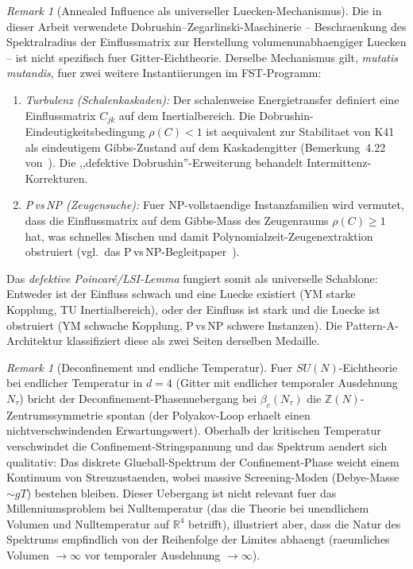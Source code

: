\documentclass[12pt,a4paper]{article}
\theoremstyle{definition}
\theoremstyle{plain}
\theoremstyle{remark}
\newtheorem{remark}[definition]{Remark}
\begin{document}
\begin{remark}[Annealed Influence als universeller Luecken-Mechanismus]
\label{rem:annealed-influence-universal}
Die in dieser Arbeit verwendete Dobrushin--Zegarlinski-Maschinerie -- Beschraenkung des Spektralradius der Einflussmatrix zur Herstellung volumenunabhaengiger Luecken -- ist nicht spezifisch fuer Gitter-Eichtheorie. Derselbe Mechanismus gilt, \emph{mutatis mutandis}, fuer zwei weitere Instantiierungen im FST-Programm:
\begin{enumerate}
\item \emph{Turbulenz (Schalenkaskaden):} Der schalenweise Energietransfer definiert eine Einflussmatrix $C_{jk}$ auf dem Inertialbereich. Die Dobrushin-Eindeutigkeitsbedingung $\rho(C) < 1$ ist aequivalent zur Stabilitaet von K41 als eindeutigem Gibbs-Zustand auf dem Kaskadengitter (Bemerkung~4.22 von~\cite{Geiger2026-TU}). Die ,,defektive Dobrushin''-Erweiterung behandelt Intermittenz-Korrekturen.
\item \emph{P\,vs\,NP (Zeugensuche):} Fuer NP-vollstaendige Instanzfamilien wird vermutet, dass die Einflussmatrix auf dem Gibbs-Mass des Zeugenraums $\rho(C) \geq 1$ hat, was schnelles Mischen und damit Polynomialzeit-Zeugenextraktion obstruiert (vgl.\ das P\,vs\,NP-Begleitpaper~\cite{Geiger2026-PvsNP}).
\end{enumerate}
Das \emph{defektive Poincar\'{e}/LSI-Lemma} fungiert somit als universelle Schablone: Entweder ist der Einfluss schwach und eine Luecke existiert (YM starke Kopplung, TU Inertialbereich), oder der Einfluss ist stark und die Luecke ist obstruiert (YM schwache Kopplung, P\,vs\,NP schwere Instanzen). Die Pattern-A-Architektur klassifiziert diese als zwei Seiten derselben Medaille.
\end{remark}

\begin{remark}[Deconfinement und endliche Temperatur]
Fuer $SU(N)$-Eichtheorie bei endlicher Temperatur in $d = 4$ (Gitter mit endlicher temporaler Ausdehnung $N_\tau$) bricht der Deconfinement-Phasenuebergang bei $\beta_c(N_\tau)$ die $\mathbb{Z}(N)$-Zentrumssymmetrie spontan (der Polyakov-Loop erhaelt einen nichtverschwindenden Erwartungswert). Oberhalb der kritischen Temperatur verschwindet die Confinement-Stringspannung und das Spektrum aendert sich qualitativ: Das diskrete Glueball-Spektrum der Confinement-Phase weicht einem Kontinuum von Streuzustaenden, wobei massive Screening-Moden (Debye-Masse $\sim gT$) bestehen bleiben. Dieser Uebergang ist nicht relevant fuer das Millenniumsproblem bei Nulltemperatur (das die Theorie bei unendlichem Volumen und Nulltemperatur auf $\mathbb{R}^4$ betrifft), illustriert aber, dass die Natur des Spektrums empfindlich von der Reihenfolge der Limites abhaengt (raeumliches Volumen $\to \infty$ vor temporaler Ausdehnung $\to \infty$).
\end{remark}
\end{document}
